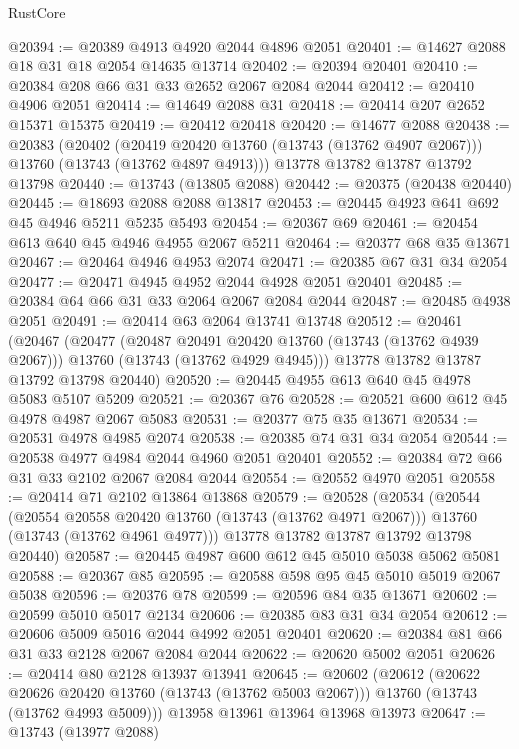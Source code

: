 \begin{lexlean}{RustCore}
\begin{coremodule}
@20394 := @20389 @4913 @4920 @2044 @4896 @2051
@20401 := @14627 @2088 @18 @31 @18 @2054 @14635 @13714
@20402 := @20394 @20401
@20410 := @20384 @208 @66 @31 @33 @2652 @2067 @2084 @2044
@20412 := @20410 @4906 @2051
@20414 := @14649 @2088 @31
@20418 := @20414 @207 @2652 @15371 @15375
@20419 := @20412 @20418
@20420 := @14677 @2088
@20438 := @20383
    (@20402
      (@20419 @20420 @13760 (@13743 (@13762 @4907 @2067)))
      @13760
      (@13743 (@13762 @4897 @4913)))
    @13778
    @13782
    @13787
    @13792
    @13798
@20440 := @13743 (@13805 @2088)
@20442 := @20375 (@20438 @20440)
@20445 := @18693 @2088 @2088 @13817
@20453 := @20445 @4923 @641 @692 @45 @4946 @5211 @5235 @5493
@20454 := @20367 @69
@20461 := @20454 @613 @640 @45 @4946 @4955 @2067 @5211
@20464 := @20377 @68 @35 @13671
@20467 := @20464 @4946 @4953 @2074
@20471 := @20385 @67 @31 @34 @2054
@20477 := @20471 @4945 @4952 @2044 @4928 @2051 @20401
@20485 := @20384 @64 @66 @31 @33 @2064 @2067 @2084 @2044
@20487 := @20485 @4938 @2051
@20491 := @20414 @63 @2064 @13741 @13748
@20512 := @20461
    (@20467
      (@20477
        (@20487 @20491 @20420 @13760 (@13743 (@13762 @4939 @2067)))
        @13760
        (@13743 (@13762 @4929 @4945)))
      @13778
      @13782
      @13787
      @13792
      @13798
      @20440)
@20520 := @20445 @4955 @613 @640 @45 @4978 @5083 @5107 @5209
@20521 := @20367 @76
@20528 := @20521 @600 @612 @45 @4978 @4987 @2067 @5083
@20531 := @20377 @75 @35 @13671
@20534 := @20531 @4978 @4985 @2074
@20538 := @20385 @74 @31 @34 @2054
@20544 := @20538 @4977 @4984 @2044 @4960 @2051 @20401
@20552 := @20384 @72 @66 @31 @33 @2102 @2067 @2084 @2044
@20554 := @20552 @4970 @2051
@20558 := @20414 @71 @2102 @13864 @13868
@20579 := @20528
    (@20534
      (@20544
        (@20554 @20558 @20420 @13760 (@13743 (@13762 @4971 @2067)))
        @13760
        (@13743 (@13762 @4961 @4977)))
      @13778
      @13782
      @13787
      @13792
      @13798
      @20440)
@20587 := @20445 @4987 @600 @612 @45 @5010 @5038 @5062 @5081
@20588 := @20367 @85
@20595 := @20588 @598 @95 @45 @5010 @5019 @2067 @5038
@20596 := @20376 @78
@20599 := @20596 @84 @35 @13671
@20602 := @20599 @5010 @5017 @2134
@20606 := @20385 @83 @31 @34 @2054
@20612 := @20606 @5009 @5016 @2044 @4992 @2051 @20401
@20620 := @20384 @81 @66 @31 @33 @2128 @2067 @2084 @2044
@20622 := @20620 @5002 @2051
@20626 := @20414 @80 @2128 @13937 @13941
@20645 := @20602
    (@20612
      (@20622 @20626 @20420 @13760 (@13743 (@13762 @5003 @2067)))
      @13760
      (@13743 (@13762 @4993 @5009)))
    @13958
    @13961
    @13964
    @13968
    @13973
@20647 := @13743 (@13977 @2088)

\end{coremodule}
\end{lexlean}
